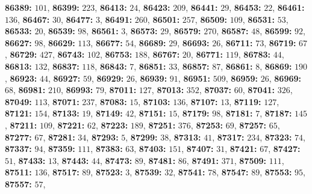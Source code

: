 \textsf{\bfseries 86389:} $101$, \textsf{\bfseries 86399:} $223$, \textsf{\bfseries 86413:} $24$, \textsf{\bfseries 86423:} $209$, \textsf{\bfseries 86441:} $29$, \textsf{\bfseries 86453:} $22$, \textsf{\bfseries 86461:} $136$, \textsf{\bfseries 86467:} $30$, \textsf{\bfseries 86477:} $3$, \textsf{\bfseries 86491:} $260$, \textsf{\bfseries 86501:} $257$, \textsf{\bfseries 86509:} $109$, \textsf{\bfseries 86531:} $53$, \textsf{\bfseries 86533:} $20$, \textsf{\bfseries 86539:} $98$, \textsf{\bfseries 86561:} $3$, \textsf{\bfseries 86573:} $29$, \textsf{\bfseries 86579:} $270$, \textsf{\bfseries 86587:} $48$, \textsf{\bfseries 86599:} $92$, \textsf{\bfseries 86627:} $98$, \textsf{\bfseries 86629:} $113$, \textsf{\bfseries 86677:} $54$, \textsf{\bfseries 86689:} $29$, \textsf{\bfseries 86693:} $26$, \textsf{\bfseries 86711:} $73$, \textsf{\bfseries 86719:} $67$, \textsf{\bfseries 86729:} $427$, \textsf{\bfseries 86743:} $102$, \textsf{\bfseries 86753:} $188$, \textsf{\bfseries 86767:} $20$, \textsf{\bfseries 86771:} $119$, \textsf{\bfseries 86783:} $44$, \textsf{\bfseries 86813:} $132$, \textsf{\bfseries 86837:} $118$, \textsf{\bfseries 86843:} $7$, \textsf{\bfseries 86851:} $33$, \textsf{\bfseries 86857:} $87$, \textsf{\bfseries 86861:} $8$, \textsf{\bfseries 86869:} $190$, \textsf{\bfseries 86923:} $44$, \textsf{\bfseries 86927:} $59$, \textsf{\bfseries 86929:} $26$, \textsf{\bfseries 86939:} $91$, \textsf{\bfseries 86951:} $509$, \textsf{\bfseries 86959:} $26$, \textsf{\bfseries 86969:} $68$, \textsf{\bfseries 86981:} $210$, \textsf{\bfseries 86993:} $79$, \textsf{\bfseries 87011:} $127$, \textsf{\bfseries 87013:} $352$, \textsf{\bfseries 87037:} $60$, \textsf{\bfseries 87041:} $326$, \textsf{\bfseries 87049:} $113$, \textsf{\bfseries 87071:} $237$, \textsf{\bfseries 87083:} $15$, \textsf{\bfseries 87103:} $136$, \textsf{\bfseries 87107:} $13$, \textsf{\bfseries 87119:} $127$, \textsf{\bfseries 87121:} $154$, \textsf{\bfseries 87133:} $19$, \textsf{\bfseries 87149:} $42$, \textsf{\bfseries 87151:} $15$, \textsf{\bfseries 87179:} $98$, \textsf{\bfseries 87181:} $7$, \textsf{\bfseries 87187:} $145$, \textsf{\bfseries 87211:} $109$, \textsf{\bfseries 87221:} $62$, \textsf{\bfseries 87223:} $189$, \textsf{\bfseries 87251:} $376$, \textsf{\bfseries 87253:} $69$, \textsf{\bfseries 87257:} $65$, \textsf{\bfseries 87277:} $67$, \textsf{\bfseries 87281:} $34$, \textsf{\bfseries 87293:} $5$, \textsf{\bfseries 87299:} $38$, \textsf{\bfseries 87313:} $41$, \textsf{\bfseries 87317:} $234$, \textsf{\bfseries 87323:} $74$, \textsf{\bfseries 87337:} $94$, \textsf{\bfseries 87359:} $111$, \textsf{\bfseries 87383:} $63$, \textsf{\bfseries 87403:} $151$, \textsf{\bfseries 87407:} $31$, \textsf{\bfseries 87421:} $67$, \textsf{\bfseries 87427:} $51$, \textsf{\bfseries 87433:} $13$, \textsf{\bfseries 87443:} $44$, \textsf{\bfseries 87473:} $89$, \textsf{\bfseries 87481:} $86$, \textsf{\bfseries 87491:} $371$, \textsf{\bfseries 87509:} $111$, \textsf{\bfseries 87511:} $136$, \textsf{\bfseries 87517:} $89$, \textsf{\bfseries 87523:} $3$, \textsf{\bfseries 87539:} $32$, \textsf{\bfseries 87541:} $78$, \textsf{\bfseries 87547:} $89$, \textsf{\bfseries 87553:} $95$, \textsf{\bfseries 87557:} $57$, 
